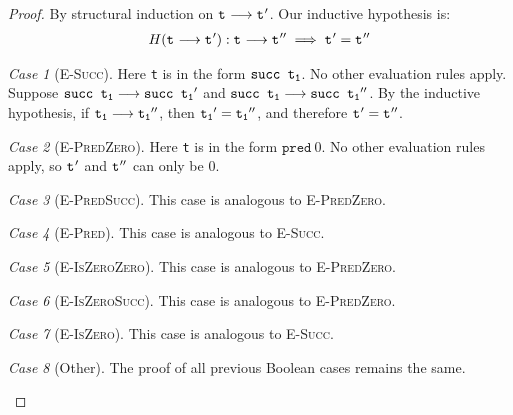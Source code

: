 \documentclass{article}
\newcommand{\term}[1]{\texttt{t\textsubscript{#1}}}
\newcommand{\ms}[1]{\texttt{#1}}
\theoremstyle{remark}
\newtheorem*{case}{Case}
\begin{document}
    \begin{proof}
        By structural induction on $\term{} \longrightarrow \term{}'$. Our inductive hypothesis is:
        \begin{align*}
            H(\term{} \longrightarrow \term{}'): \term{} \longrightarrow \term{}'' \implies \term{}' = \term{}''
        \end{align*}

        \begin{case}[\textsc{E-Succ}]
            Here \term{} is in the form $\ms{succ \term{1}}$. No other evaluation rules apply.
            Suppose $\ms{succ \term{1}} \longrightarrow \ms{succ \term{1}}'$ and
            $\ms{succ \term{1}} \longrightarrow \ms{succ \term{1}}''$.
            By the inductive hypothesis, if $\term{1} \longrightarrow \term{1}''$,
            then $\term{1}' = \term{1}''$, and therefore $\term{}' = \term{}''$.
        \end{case}

        \begin{case}[\textsc{E-PredZero}]
            Here \term{} is in the form $\ms{pred}\ 0$. No other evaluation rules apply,
            so $\term{}'$ and $\term{}''$ can only be $0$.
        \end{case}

        \begin{case}[\textsc{E-PredSucc}]
            This case is analogous to \textsc{E-PredZero}.
        \end{case}

        \begin{case}[\textsc{E-Pred}]
            This case is analogous to \textsc{E-Succ}.
        \end{case}

        \begin{case}[\textsc{E-IsZeroZero}]
            This case is analogous to \textsc{E-PredZero}.
        \end{case}

        \begin{case}[\textsc{E-IsZeroSucc}]
            This case is analogous to \textsc{E-PredZero}.
        \end{case}

        \begin{case}[\textsc{E-IsZero}]
            This case is analogous to \textsc{E-Succ}.
        \end{case}

        \begin{case}[Other]
            The proof of all previous Boolean cases remains the same.
        \end{case}
    \end{proof}
\end{document}
